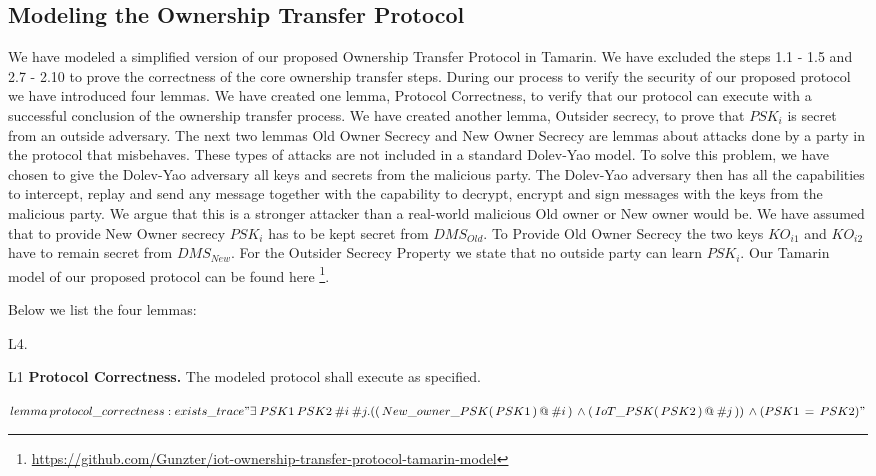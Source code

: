 {\subsection{Modeling the Ownership Transfer Protocol}
We have modeled a simplified version of our proposed Ownership Transfer Protocol in Tamarin. We have excluded the steps 1.1 - 1.5 and 2.7 - 2.10 to prove the correctness of the core ownership transfer steps. During our process to verify the security of our proposed protocol we have introduced four lemmas.
We have created one lemma, Protocol Correctness, to verify that our protocol can execute with a successful conclusion of the ownership transfer process. We have created another lemma, Outsider secrecy, to prove that $PSK_i$ is secret from an outside adversary. The next two lemmas Old Owner Secrecy and New Owner Secrecy are lemmas about attacks done by a party in the protocol that misbehaves. These types of attacks are not included in a standard Dolev-Yao model. To solve this problem, we have chosen to give the Dolev-Yao adversary all keys and secrets from the malicious party. The Dolev-Yao adversary then has all the capabilities to intercept, replay and send any message together with the capability to decrypt, encrypt and sign messages with the keys from the malicious party. We argue that this is a stronger attacker than a real-world malicious Old owner or New owner would be.
We have assumed that to provide New Owner secrecy $PSK_i$ has to be kept secret from $DMS_{Old}$. To Provide Old Owner Secrecy the two keys $KO_{i1}$ and $KO_{i2}$ have to remain secret from $DMS_{New}$. For the Outsider Secrecy Property we state that no outside party can learn $PSK_i$. Our Tamarin model of our proposed protocol can be found here \footnote{\url{https://github.com/Gunzter/iot-ownership-transfer-protocol-tamarin-model}}.

Below we list the four lemmas:
\begin{labeling}{L4.}
\item[L1] \textbf{Protocol Correctness.} The modeled protocol shall execute as specified.

$lemma \, protocol\_correctness: \\
	exists\_trace \\
	" \exists \: PSK1 \: PSK2 \: \#i \: \#j. \\
	(( \, New\_owner\_PSK( \, PSK1 \, ) \, @ \: \#i \, ) \, \wedge \\
 	( \, IoT\_PSK( \, PSK2 \, ) \, @ \: \#j \, )) \, \wedge \\
	(PSK1 \, = \, PSK2)"$


\end{labeling}}
